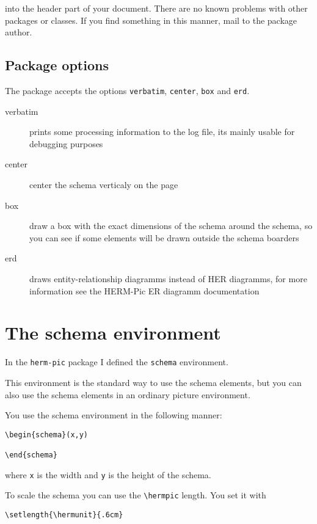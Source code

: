 \documentclass[a4paper,11pt]{article}
\begin{document}
into the header part of your document. There are no known problems with other
packages or classes. If you find something in this manner, mail to the package 
author.

\subsection{Package options}

The package accepts the options {\tt verbatim}, {\tt center}, {\tt box} and {\tt erd}.

\begin{description}
\item[verbatim] prints some processing information to the log file, its mainly 
  usable for debugging purposes
\item[center] center the schema verticaly on the page
\item[box] draw a box with the exact dimensions of the schema around the schema, so you
  can see if some elements will be drawn outside the schema boarders
\item[erd] draws entity-relationship diagramms instead of HER diagramms, 
for more information see the HERM-Pic ER diagramm documentation
\end{description}

\section{The schema environment}

In the {\tt herm-pic} package I defined the {\tt schema} environment.

This environment is the standard way to use the schema elements, but you 
can also use the schema elements in an ordinary picture environment.

You use the schema environment in the following manner:

\begin{verbatim}
\begin{schema}(x,y)

\end{schema}
\end{verbatim}

where {\tt x} is the width and {\tt y} is the height of 
the schema.

To scale the schema you can use the \verb|\hermpic| length.
You set it with

\begin{verbatim}
\setlength{\hermunit}{.6cm}
\end{verbatim}
\end{document}
